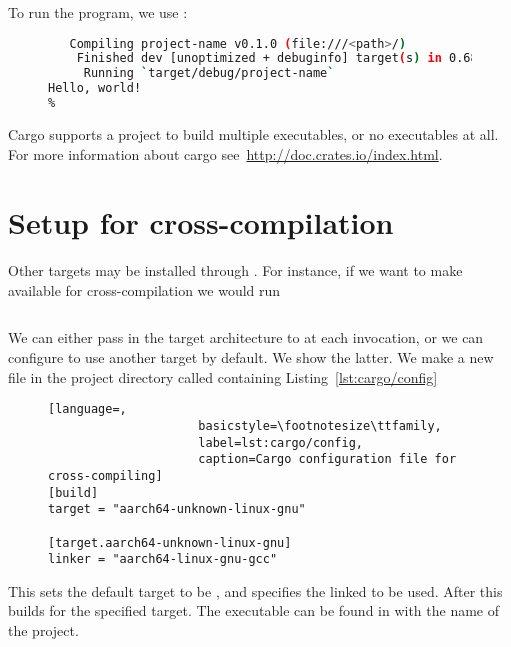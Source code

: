 \documentclass[b5paper,twoside]{report}
\begin{document}
\begin{appendices}
  To run the program, we use \cargo{}:
  \begin{figure}[ht]
  \begin{lstlisting}[language=Bash,numbers=none]
% cargo run
   Compiling project-name v0.1.0 (file:///<path>/)
    Finished dev [unoptimized + debuginfo] target(s) in 0.68 secs
     Running `target/debug/project-name`
Hello, world!
%
  \end{lstlisting}
\end{figure}

  Cargo supports a project to build multiple executables, or no executables at all.
  For more information about cargo see~\url{http://doc.crates.io/index.html}.


  \section*{Setup for cross-compilation}
  Other targets may be installed through \rustup{}. For instance, if we want to
  make  available for cross-compilation we would run
  \begin{lstlisting}[language=Bash,numbers=none]
% rustup target add aarch64-unknown-linux-gnu
  \end{lstlisting}
  We can either pass in the target architecture to \cargo{} at each invocation,
  or we can configure \cargo{} to use another target by default. We show the latter.
  We make a new file in the project directory called 
  containing Listing~\ref{lst:cargo/config}
  \begin{figure}[ht]
  \begin{lstlisting}[language=,
                     basicstyle=\footnotesize\ttfamily,
                     label=lst:cargo/config,
                     caption=Cargo configuration file for cross-compiling]
[build]
target = "aarch64-unknown-linux-gnu"

[target.aarch64-unknown-linux-gnu]
linker = "aarch64-linux-gnu-gcc"
  \end{lstlisting}
  \end{figure}
  This sets the default target to be ,
  and specifies the linked to be used.
  After this  builds for the specified target.
  The executable can be found in 
  with the name of the project.




\end{appendices}



\end{document}
